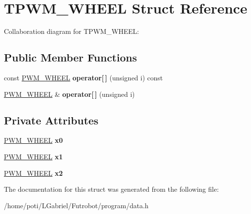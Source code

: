 \hypertarget{structTPWM__WHEEL}{}\section{T\+P\+W\+M\+\_\+\+W\+H\+E\+EL Struct Reference}
\label{structTPWM__WHEEL}


Collaboration diagram for T\+P\+W\+M\+\_\+\+W\+H\+E\+EL\+:
\subsection*{Public Member Functions}
\begin{DoxyCompactItemize}
\item 
const \hyperlink{structPWM__WHEEL}{P\+W\+M\+\_\+\+W\+H\+E\+EL} {\bfseries operator\mbox{[}$\,$\mbox{]}} (unsigned i) const \hypertarget{structTPWM__WHEEL_a5663276f85fa4304ad99dc2e7fb13b09}{}\label{structTPWM__WHEEL_a5663276f85fa4304ad99dc2e7fb13b09}

\item 
\hyperlink{structPWM__WHEEL}{P\+W\+M\+\_\+\+W\+H\+E\+EL} \& {\bfseries operator\mbox{[}$\,$\mbox{]}} (unsigned i)\hypertarget{structTPWM__WHEEL_abe57ad2c090bd01bb1bf836ea146dde9}{}\label{structTPWM__WHEEL_abe57ad2c090bd01bb1bf836ea146dde9}

\end{DoxyCompactItemize}
\subsection*{Private Attributes}
\begin{DoxyCompactItemize}
\item 
\hyperlink{structPWM__WHEEL}{P\+W\+M\+\_\+\+W\+H\+E\+EL} {\bfseries x0}\hypertarget{structTPWM__WHEEL_a703235df159b23809279f74bee986244}{}\label{structTPWM__WHEEL_a703235df159b23809279f74bee986244}

\item 
\hyperlink{structPWM__WHEEL}{P\+W\+M\+\_\+\+W\+H\+E\+EL} {\bfseries x1}\hypertarget{structTPWM__WHEEL_aaa27aeb20349556863d5a28970018265}{}\label{structTPWM__WHEEL_aaa27aeb20349556863d5a28970018265}

\item 
\hyperlink{structPWM__WHEEL}{P\+W\+M\+\_\+\+W\+H\+E\+EL} {\bfseries x2}\hypertarget{structTPWM__WHEEL_a772dadc7849f9aecdd5b06183f23feb3}{}\label{structTPWM__WHEEL_a772dadc7849f9aecdd5b06183f23feb3}

\end{DoxyCompactItemize}


The documentation for this struct was generated from the following file\+:\begin{DoxyCompactItemize}
\item 
/home/poti/\+L\+Gabriel/\+Futrobot/program/data.\+h\end{DoxyCompactItemize}
